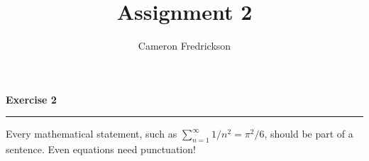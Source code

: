 \documentclass{article}
\title{Assignment 2}
\author{Cameron Fredrickson}
\date{}
\begin{document}
\maketitle

\noindent \textbf{Exercise 2}

\noindent \rule{\textwidth}{.1mm}

Every mathematical statement, such as $ \sum_{n=1}^\infty 1/n^2 = \pi^2/6$, should be part of a sentence. Even equations need punctuation!
\end{document}
